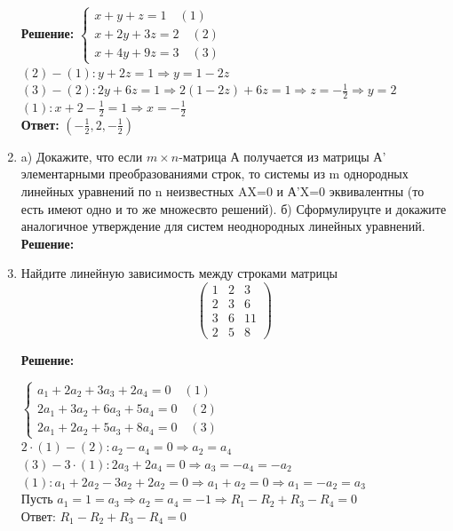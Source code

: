 \documentclass[]{book}
\theoremstyle{definition}
\begin{document}
\begin{enumerate}[resume]
\textbf{Решение:}
$
\begin{cases}
   x+y+z=1 \quad (1) \\
   x+2y+3z=2\quad (2) \\
   x+4y+9z=3\quad (3)
 \end{cases}
$\\

$(2)-(1)\colon y+2z=1 \Longrightarrow y=1-2z$\\
$(3)-(2)\colon 2y+6z=1 \Longrightarrow 2(1-2z)+6z=1 \Longrightarrow z = -\frac{1}{2} \Longrightarrow y = 2$\\
$(1): x+2-\frac{1}{2}=1 \Longrightarrow x = -\frac{1}{2}$\\

\textbf{Ответ: } $(-\frac{1}{2}, 2, -\frac{1}{2})$


\item a) Докажите, что если $m\times n$-матрица А получается из матрицы А' элементарными преобразованиями строк, то системы из m  однородных линейных уравнений по n неизвестных AX=0 и А'X=0 эквивалентны (то есть имеют одно и то же множесвто решений).
б) Сформулируцте и докажите аналогичное утверждение для систем неоднородных линейных уравнений.\\
\textbf{Решение:}




\item Найдите линейную зависимость между строками матрицы 
$$
\begin{pmatrix} 
1 & 2 & 3 \\
2 & 3 & 6 \\
3 & 6 & 11 \\
2 & 5 & 8
\end{pmatrix}
$$

\textbf{Решение:}

$
\begin{cases}
   a_1+2a_2+3a_3+2a_4=0 \quad (1) \\
   2a_1+3a_2+6a_3+5a_4=0\quad (2) \\
   2a_1+2a_2+5a_3+8a_4=0\quad (3)
 \end{cases}
$\\

$2\cdot (1)-(2)\colon a_2 - a_4 = 0 \Longrightarrow a_2 = a_4$\\
$(3)- 3\cdot (1)\colon 2a_3 + 2a_4 = 0 \Longrightarrow a_3 = -a_4 = -a_2 $\\
$(1): a_1 + 2a_2 - 3a_2 + 2a_2 = 0 \Longrightarrow a_1 + a_2 =0 \Longrightarrow a_1 = -a_2 = a_3 $\\
Пусть $a_1 = 1 = a_3 \Longrightarrow a_2=a_4=-1 \Longrightarrow R_1 - R_2+R_3-R_4 = 0$\\
Ответ: $R_1 - R_2+R_3-R_4 = 0$





\end{enumerate}
\end{document}
